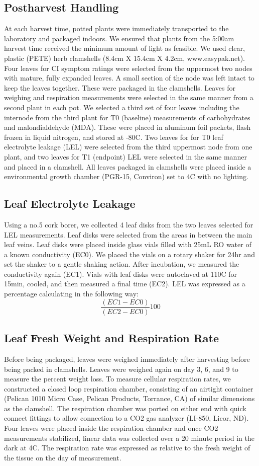 \documentclass{article}\usepackage[]{graphicx}\usepackage[]{color}
\begin{document}
\subsection{Postharvest Handling}
At each harvest time, potted plants were immediately transported to the laboratory and packaged indoors. We ensured that plants from the 5:00am harvest time received the minimum amount of light as feasible. We used clear, plastic (PETE) herb clamshells (8.4cm X 15.4cm X 4.2cm, www.easypak.net). Four leaves for CI symptom ratings were selected from the uppermost two nodes with mature, fully expanded leaves. A small section of the node was left intact to keep the leaves together. These were packaged in the clamshells. Leaves for weighing and respiration measurements were selected in the same manner from a second plant in each pot. We selected a third set of four leaves including the internode from the third plant for T0 (baseline) measurements of carbohydrates and malondialdehyde (MDA). These were placed in aluminum foil packets, flash frozen in liquid nitrogen, and stored at -80C. Two leaves for for T0 leaf electrolyte leakage (LEL) were selected from the third uppermost node from one plant, and two leaves for T1 (endpoint) LEL were selected in the same manner and placed in a clamshell. All leaves packaged in clamshells were placed inside a environmental growth chamber (PGR-15, Conviron) set to 4C with no lighting. 

\subsection{Leaf Electrolyte Leakage}
Using a no.5 cork borer, we collected 4 leaf disks from the two leaves selected for LEL measurements. Leaf disks were selected from the areas in between the main leaf veins. Leaf disks were placed inside glass vials filled with 25mL RO water of a known conductivity (EC0). We placed the vials on a rotary shaker for 24hr and set the shaker to a gentle shaking action. After incubation, we measured the conductivity again (EC1). Vials with leaf disks were autoclaved at 110C for 15min, cooled, and then measured a final time (EC2). LEL was expressed as a percentage calculating in the following way:
\[
        \frac{(EC1-EC0)}{(EC2-EC0)}100
\]
\subsection{Leaf Fresh Weight and Respiration Rate}
Before being packaged, leaves were weighed immediately after harvesting before being packed in clamshells. Leaves were weighed again on day 3, 6, and 9 to measure the percent weight loss. To measure cellular respiration rates, we constructed a closed loop respiration chamber, consisting of an airtight container (Pelican 1010 Micro Case, Pelican Products, Torrance, CA) of similar dimensions as the clamshell. The respiration chamber was ported on either end with quick connect fittings to allow connection to a CO2 gas analyzer (LI-850, Licor, ND). Four leaves were placed inside the respiration chamber and once CO2 measurements stabilized, linear data was collected over a 20 minute period in the dark at 4C. The respiration rate was expressed as relative to the fresh weight of the tissue on the day of measurement.
\end{document}
